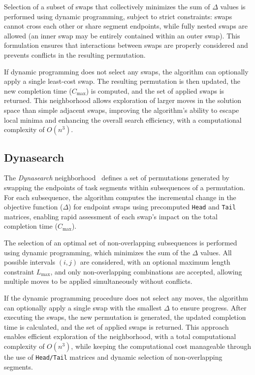 \documentclass[10pt,twoside,twocolumn,a4paper]{article}
\begin{document}
Selection of a subset of swaps that collectively minimizes the sum of $\Delta$ values is performed using dynamic programming, subject to strict constraints: swaps cannot cross each other or share segment endpoints, while fully nested swaps are allowed (an inner swap may be entirely contained within an outer swap). This formulation ensures that interactions between swaps are properly considered and prevents conflicts in the resulting permutation.

If dynamic programming does not select any swaps, the algorithm can optionally apply a single least-cost swap. The resulting permutation is then updated, the new completion time ($C_{\max}$) is computed, and the set of applied swaps is returned. This neighborhood allows exploration of larger moves in the solution space than simple adjacent swaps, improving the algorithm's ability to escape local minima and enhancing the overall search efficiency, with a computational complexity of $O(n^3)$.


\subsection{Dynasearch}
The \emph{Dynasearch} neighborhood~\cite{dynasearch_Campos} defines a set of permutations generated by swapping the endpoints of task segments within subsequences of a permutation. For each subsequence, the algorithm computes the incremental change in the objective function ($\Delta$) for endpoint swaps using precomputed \texttt{Head} and \texttt{Tail} matrices, enabling rapid assessment of each swap's impact on the total completion time ($C_{\max}$).

The selection of an optimal set of non-overlapping subsequences is performed using dynamic programming, which minimizes the sum of the $\Delta$ values. All possible intervals $(i,j)$ are considered, with an optional maximum length constraint $L_{\max}$, and only non-overlapping combinations are accepted, allowing multiple moves to be applied simultaneously without conflicts.

If the dynamic programming procedure does not select any moves, the algorithm can optionally apply a single swap with the smallest $\Delta$ to ensure progress. After executing the swaps, the new permutation is generated, the updated completion time is calculated, and the set of applied swaps is returned. This approach enables efficient exploration of the neighborhood, with a total computational complexity of $O(n^3)$, while keeping the computational cost manageable through the use of \texttt{Head/Tail} matrices and dynamic selection of non-overlapping segments.
\end{document}
